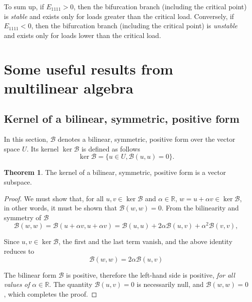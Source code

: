 \documentclass[12pt, final]{scrartcl}
\theoremstyle{definition}
\newtheorem{theorem}{Theorem}
\newcommand{\reals}{\mathbb{R}}
\begin{document}
To sum up, if $E_{1111} > 0$, then the bifurcation branch (including the
critical point) is \emph{stable} and exists only for loads greater than the
critical load. Conversely, if $E_{1111} < 0$, then the bifurcation branch
(including the critical point) is \emph{unstable} and exists only for loads
lower than the critical load.

\appendix

\section{Some useful results from multilinear algebra}

\subsection{Kernel of a bilinear, symmetric, positive form}

In this section, $\mathcal{B}$ denotes a bilinear, symmetric, positive form
over the vector space $U$. Its kernel $\ker \mathcal{B}$ is defined as
follows
\begin{equation}
 \ker \mathcal{B}= \bigl\{ u \in U, \mathcal{B}(u, u) = 0 \bigr\} .
\end{equation}

\begin{theorem}
  The kernel of a bilinear, symmetric, positive form is a vector subspace.
\end{theorem}
\begin{proof}
  We must show that, for all $u, v \in\ker \mathcal{B}$ and $α \in \reals$,
  $w = u + α v \in \ker \mathcal{B}$, in other words, it must be shown that
  $\mathcal{B}(w, w) = 0$. From the bilinearity and symmetry of
  $\mathcal{B}$
 \begin{equation*}
   \mathcal{B}(w, w) = \mathcal{B}(u + α v, u + α v)
   = \mathcal{B}(u, u) + 2 α \mathcal{B}(u, v) + α^2 \mathcal{B}(v, v),
 \end{equation*}

 Since $u, v \in \ker\mathcal{B}$, the first and the last term vanish, and the above identity reduces to
 \begin{equation*}
   \mathcal{B}(w, w) = 2α \mathcal{B}(u, v)
 \end{equation*}

 The bilinear form $\mathcal{B}$ is positive, therefore the left-hand side is
 positive, \emph{for all values of $α \in \reals$}. The quantity
 $\mathcal{B}(u, v) = 0$ is necessarily null, and $\mathcal{B}(w, w) = 0$,
 which completes the proof.
\end{proof}
\end{document}
